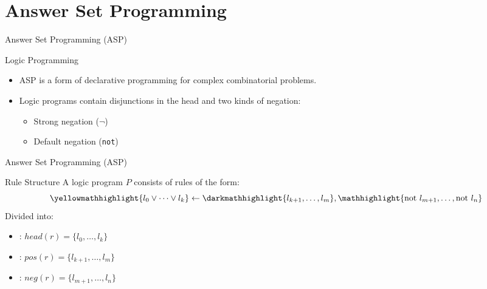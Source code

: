 \section{Answer Set Programming}

\begin{frame}{Answer Set Programming (ASP)}
    \begin{block}{Logic Programming}
        \begin{itemize}
            \item ASP is a form of declarative programming for complex combinatorial problems.
            \item Logic programs contain disjunctions in the head and two kinds of negation:
                  \begin{itemize}
                      \item Strong negation ($\neg$)
                      \item Default negation (\texttt{not})
                  \end{itemize}
        \end{itemize}
    \end{block}
\end{frame}

\begin{frame}{Answer Set Programming (ASP)}
    \begin{alertblock}{Rule Structure}
        A logic program $P$ consists of rules of the form:
        \[
            \yellowmathhighlight{l_0 \lor \dots \lor l_k} \leftarrow \darkmathhighlight{l_{k+1}, \dots, l_m}, \mathhighlight{\text{not } l_{m+1}, \dots, \text{not } l_n}
        \]
        Divided into:
        \begin{itemize}
            \item {}: $head(r) = \{l_0, \dots, l_k\}$
            \item {}: $pos(r) = \{l_{k+1}, \dots, l_m\}$
            \item {}: $neg(r) = \{l_{m+1}, \dots, l_n\}$
        \end{itemize}
    \end{alertblock}
\end{frame}

